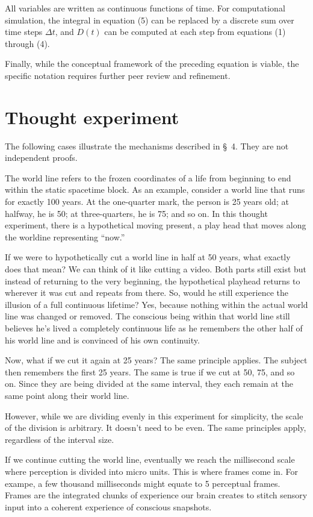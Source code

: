 \documentclass[11pt,a4paper]{article}
\begin{document}
All variables are written as continuous functions of time. For computational simulation, the integral in equation (5) can be replaced by a discrete sum over time steps $\Delta t$, and $D(t)$ can be computed at each step from equations (1) through (4).

Finally, while the conceptual framework of the preceding equation is viable, the specific notation requires further peer review and refinement.

\section{Thought experiment}

The following cases illustrate the mechanisms described in \S~4. They are not independent proofs.

The world line refers to the frozen coordinates of a life from beginning to end within the static spacetime block. As an example, consider a world line that runs for exactly 100 years. At the one-quarter mark, the person is 25 years old; at halfway, he is 50; at three-quarters, he is 75; and so on. In this thought experiment, there is a hypothetical moving present, a play head that moves along the worldine representing ``now.''

If we were to hypothetically cut a world line in half at 50 years, what exactly does that mean? We can think of it like cutting a video. Both parts still exist but instead of returning to the very beginning, the hypothetical playhead returns to wherever it was cut and repeats from there. So, would he still experience the illusion of a full continuous lifetime? Yes, because nothing within the actual world line was changed or removed. The conscious being within that world line still believes he's lived a completely continuous life as he remembers the other half of his world line and is convinced of his own continuity.

Now, what if we cut it again at 25 years? The same principle applies. The subject then remembers the first 25 years. The same is true if we cut at 50, 75, and so on. Since they are being divided at the same interval, they each remain at the same point along their world line.

However, while we are dividing evenly in this experiment for simplicity, the scale of the division is arbitrary. It doesn't need to be even. The same principles apply, regardless of the interval size.

If we continue cutting the world line, eventually we reach the millisecond scale where perception is divided into micro units. This is where frames come in. For exampe, a few thousand milliseconds might equate to 5 perceptual frames. Frames are the integrated chunks of experience our brain creates to stitch sensory input into a coherent experience of conscious snapshots.
\end{document}

